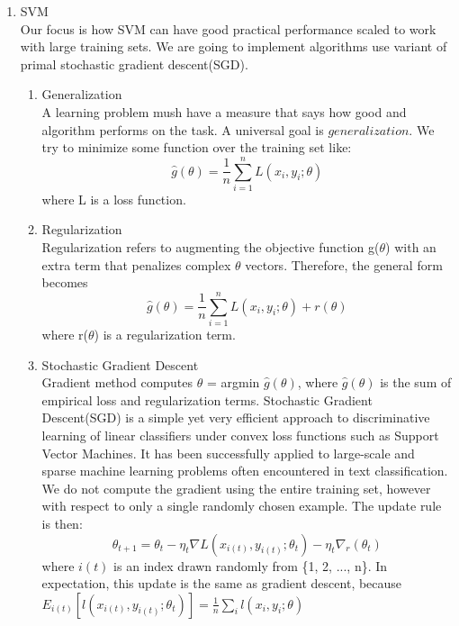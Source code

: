 \documentclass [a4paper, 11pt, oneside, final]{article}
\numberwithin{equation}{section}		%
\numberwithin{figure}{section}			%
\numberwithin{table}{section}				%
\begin{document}
\begin{enumerate}
\item SVM \\
Our focus is how SVM can have good practical performance scaled to work with large training sets. We are going to implement algorithms use variant of primal stochastic gradient descent(SGD).
\begin{enumerate}
\item Generalization \\
A learning problem mush have a measure that says how good and algorithm performs on the task. A universal goal is $generalization$. We try to minimize some function over the training set like: $$\hat{g}(\theta) = \frac{1}{n}\sum_{i=1}^{n} L(x_{i}, y_{i}; \theta)$$ where L is a loss function.

\item Regularization \\
Regularization refers to augmenting the objective function g($\theta$) with an extra term that penalizes complex $\theta$ vectors. Therefore, the general form becomes $$\hat{g}(\theta) = \frac{1}{n}\sum_{i=1}^{n} L(x_{i}, y_{i}; \theta) + r(\theta)$$ where r($\theta$) is a regularization term.

\item Stochastic Gradient Descent \\
Gradient method computes $\theta$ = argmin $\hat{g}(\theta)$, where $\hat{g}(\theta)$ is the sum of empirical loss and regularization terms.
Stochastic Gradient Descent(SGD) is a simple yet very efficient approach to discriminative learning of linear classifiers under convex loss functions such as Support Vector Machines. It has been successfully applied to large-scale and sparse machine learning problems often encountered in text classification. We do not compute the gradient using the entire training set, however with respect to only a single randomly chosen example. The update rule is then:
$$ \theta_{t+1} = \theta_{t} - \eta_{t} \nabla  L(x_{i(t)}, y_{i(t)}; \theta_{t}) - \eta_{t} \nabla_{r}(\theta_{t})$$ where $i(t)$ is an index drawn randomly from \{1, 2, ..., n\}.
In expectation, this update is the same as gradient descent, because $E_{i(t)}[ l(x_{i(t)}, y_{i(t)}; \theta_{t})] =  \frac{1}{n}\sum_{i} l(x_{i}, y_{i}; \theta)$ \\


\end{enumerate}
\end{enumerate}
\end{document}
